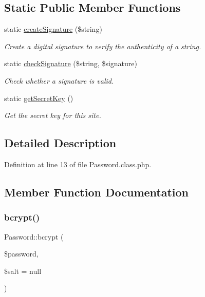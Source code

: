 \subsection*{Static Public Member Functions}
\begin{DoxyCompactItemize}
\item 
static \hyperlink{classPassword_ab68f934440f505f866bbeff9559fbefc}{create\+Signature} (\$string)
\begin{DoxyCompactList}\small\item\em Create a digital signature to verify the authenticity of a string. \end{DoxyCompactList}\item 
static \hyperlink{classPassword_a71ffb4de587c4d3db3cef10bcc8607e8}{check\+Signature} (\$string, \$signature)
\begin{DoxyCompactList}\small\item\em Check whether a signature is valid. \end{DoxyCompactList}\item 
static \hyperlink{classPassword_a34c9775ddb1701f8b136f872559c0fcc}{get\+Secret\+Key} ()
\begin{DoxyCompactList}\small\item\em Get the secret key for this site. \end{DoxyCompactList}\end{DoxyCompactItemize}


\subsection{Detailed Description}


Definition at line 13 of file Password.\+class.\+php.



\subsection{Member Function Documentation}
\mbox{\label{classPassword_a097e73abceaf4b976c92471f9b4a2cab}} 
\subsubsection{\texorpdfstring{bcrypt()}{bcrypt()}}
{\footnotesize\ttfamily Password\+::bcrypt (\begin{DoxyParamCaption}\item[{}]{\$password,  }\item[{}]{\$salt = {\ttfamily null} }\end{DoxyParamCaption})}



